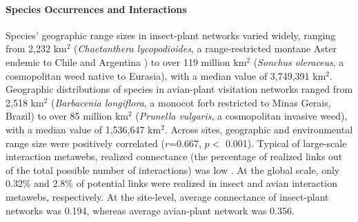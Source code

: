 \documentclass[12pt]{article}
\begin{document}
\paragraph*{Species Occurrences and Interactions}
Species' geographic range sizes in insect-plant networks varied widely, ranging from 2,232 km$^2$ (\textit{Chaetanthera lycopodioides}, a range-restricted montane Aster endemic to Chile and Argentina \cite{arroyo2007display}) to over 119 million km$^2$ (\textit{Sonchus oleraceus}, a cosmopolitan weed native to Eurasia), with a median value of 3,749,391 km$^2$. Geographic distributions of species in avian-plant visitation networks ranged from 2,518 km$^2$ (\textit{Barbacenia longiflora}, a monocot forb restricted to Minas Gerais, Brazil) to over 85 million km$^2$ (\textit{Prunella vulgaris}, a cosmopolitan invasive weed), with a median value of 1,536,647 km$^2$. Across sites, geographic and environmental range size were positively correlated ($r$=0.667, $p <$ 0.001). Typical of large-scale interaction metawebs, realized connectance (the percentage of realized links out of the total possible number of interactions) was low \citep{jordano1987patterns}. At the global scale, only 0.32\% and 2.8\% of potential links were realized in insect and avian interaction metawebs, respectively. At the site-level, average connectance of insect-plant networks was 0.194, whereas average avian-plant network was 0.356. 




\end{document}
